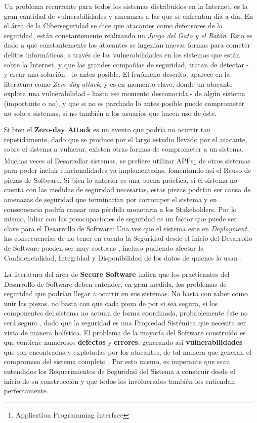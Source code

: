Un problema recurrente para todos los sistemas distribuidos en la Internet, es la gran cantidad de vulnerabilidades y amenazas a las que se enfrentan día a día. En el área de la Ciberseguridad se dice que atacantes como defensores de la seguridad, están constantemente realizando un \textit{Juego del Gato y el Ratón}. Esto es dado a que constantemente los atacantes se ingenian nuevas formas para cometer delitos informáticos, a través de las vulnerabilidades en los sistemas que están sobre la Internet, y que las grandes compañías de seguridad, tratan de detectar - y crear una solución - lo antes posible. El fenómeno descrito, aparece en la literatura como \textit{Zero-day attack}, y es en momento clave, donde un atacante explota una vulnerabilidad - hasta ese momento desconocida - de algún sistema (importante o no), y que si no es parchado lo antes posible puede comprometer no solo a sistemas, si no también a los usuarios que hacen uso de éste.

Si bien el \textbf{Zero-day Attack} es un evento que podría no ocurrir tan repetidamente, dado que se produce por el largo estudio llevado por el atacante, sobre el sistema a vulnerar, existen otras formas de comprometer a un sistema. Muchas veces al Desarrollar sistemas, se prefiere utilizar API's\footnote{Application Programming Interface} de otros sistemas para poder incluir funcionalidades ya implementadas, fomentando así el Reuso de piezas de Software. Si bien lo anterior es una buena práctica, si el sistema no cuenta con las medidas de seguridad necesarias, estas piezas podrían ser causa de amenazas de seguridad que terminarían por corromper el sistema y en consecuencia podría causar una pérdida monetaria a los Stakeholders. Por lo mismo, lidiar con las preocupaciones de seguridad es un factor que puede ser clave para el Desarrollo de Software: Una vez que el sistema este en \textit{Deployment}, las consecuencias de no tener en cuenta la Seguridad desde el inicio del Desarrollo de Software pueden ser muy costosas \cite{cert}, incluso pudiendo afectar la Confidencialidad, Integridad y Disponibilidad de los datos de quienes lo usan \cite{interCoursera}. %

La literatura del área de \textbf{Secure Software} indica que los practicantes del Desarrollo de Software deben entender, en gran medida, los problemas de seguridad que podrían llegar a ocurrir en sus sistemas. No basta con saber como unir las piezas, no basta con que cada pieza de por si sea segura, si los componentes del sistema no actuan de forma coordinada, probablemente éste no será seguro \cite{fernandez2013security}, dado que la seguridad es una Propiedad Sistémica que necesita ser vista de manera holística. El problema de la mayoría del Software construído es que contiene numerosos \textbf{defectos} y \textbf{errores}, generando así \textbf{vulnerabilidades} que son encontradas y explotadas por los atacantes, de tal manera que generan el compromiso del sistema completo \cite{goertzel2007software}. Por esto mismo, es imperante que sean entendidos los Requerimientos de Seguridad del Sistema a construir desde el inicio de su construcción y que todos los involucrados también los entiendan perfectamente. 

